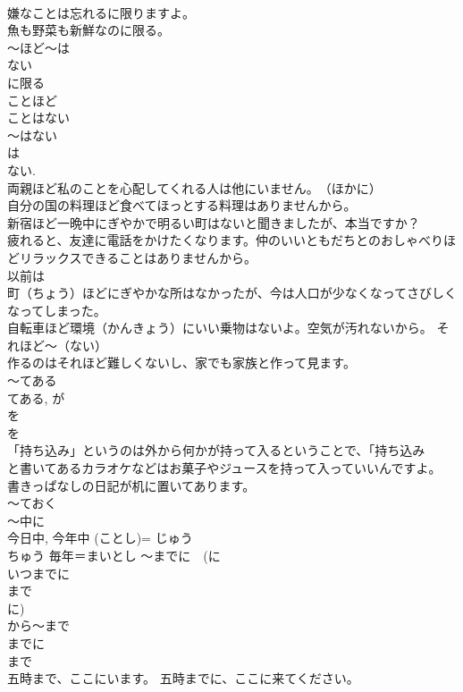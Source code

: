 \documentclass[8pt]{extreport}
\begin{document}
\begin{CJK}{UTF8}{min}
\\	嫌なことは忘れるに限りますよ。 
\\	魚も野菜も新鮮なのに限る。 
\\	～ほど～は
\\	ない 
\\	に限る 
\\	ことほど
\\	ことはない 
\\	～はない 
\\	は 
\\	ない. 
\\	両親ほど私のことを心配してくれる人は他にいません。　（ほかに） 
\\	自分の国の料理ほど食べてほっとする料理はありませんから。 
\\	新宿ほど一晩中にぎやかで明るい町はないと聞きましたが、本当ですか？ 
\\	疲れると、友達に電話をかけたくなります。仲のいいともだちとのおしゃべりほどリラックスできることはありませんから。 
\\	以前は
\\	町（ちょう）ほどにぎやかな所はなかったが、今は人口が少なくなってさびしくなってしまった。 
\\	自転車ほど環境（かんきょう）にいい乗物はないよ。空気が汚れないから。 それほど～（ない） 
\\	作るのはそれほど難しくないし、家でも家族と作って見ます。 
\\	～てある	
\\	てある, が 
\\	を 
\\	を 
\\	「持ち込み」というのは外から何かが持って入るということで、「持ち込み
\\	と書いてあるカラオケなどはお菓子やジュースを持って入っていいんですよ。 
\\	書きっぱなしの日記が机に置いてあります。 
\\	～ておく 
\\	～中に	
\\	今日中, 今年中 (ことし)= じゅう 
\\	ちゅう 毎年＝まいとし ～までに　(に 
\\	いつまでに 
\\	まで　
\\	に) 
\\	から～まで 
\\	までに 
\\	まで 
\\	五時まで、ここにいます。 五時までに、ここに来てください。

\end{CJK}
\end{document}
